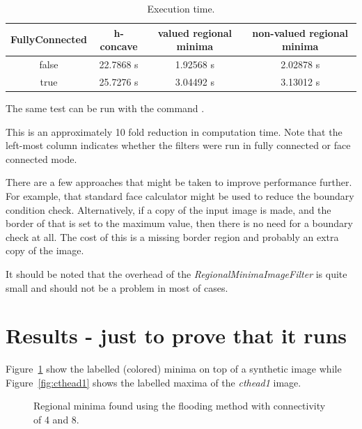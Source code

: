 \documentclass{InsightArticle}
\begin{document}
\begin{table}[htbp]
\centering
\begin{tabular}{cccc}
\hline
FullyConnected & h-concave & valued regional minima & non-valued regional minima \\
\hline
\hline
false & 22.7868 s & 1.92568 s & 2.02878 s\\
true  & 25.7276 s & 3.04492 s & 3.13012 s\\
\hline
\end{tabular}
\caption{Execution time.\label{perf}}
\end{table}

The same test can be run with the command .

This is an approximately 10 fold reduction in computation time. Note
that the left-most column indicates whether the filters were run in
fully connected or face connected mode.

There are a few approaches that might be taken to improve performance
further. For example, that standard face calculator might be used to
reduce the boundary condition check. Alternatively, if a copy of the
input image is made, and the border of that is set to the maximum
value, then there is no need for a boundary check at all. The cost of
this is a missing border region and probably an extra copy of the
image.

It should be noted that the overhead of the {\em RegionalMinimaImageFilter}
is quite small and should not be a problem in most of cases.

\section{Results - just to prove that it runs}
Figure~\ref{fig:artificial} show the labelled (colored) minima on top of
a synthetic image while Figure~\ref{fig:cthead1} shows the labelled
maxima of the {\em cthead1} image.
\begin{figure}[htbp]
\begin{center}
\caption{Regional minima found using the flooding method with connectivity of 4 and 8.\label{fig:artificial}}
\end{center}
\end{figure}
\end{document}
